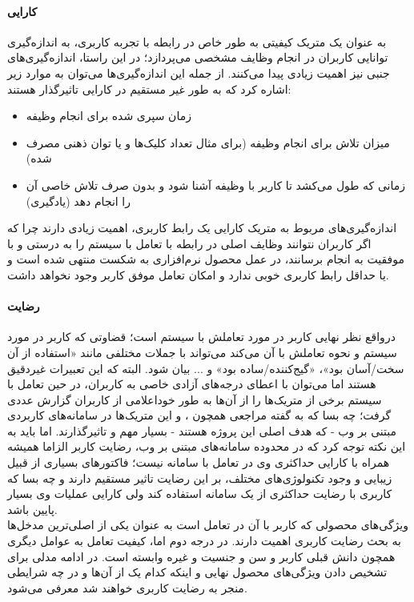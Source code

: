 \paragraph{کارایی}
به عنوان یک متریک کیفیتی به طور خاص در رابطه با تجربه کاربری، به اندازه‌گیری توانایی کاربران در انجام وظایف مشخصی می‌پردازد؛ در این راستا، اندازه‌گیری‌های جنبی نیز اهمیت زیادی پیدا می‌کنند. از جمله این اندازه‌گیری‌ها می‌توان به موارد زیر اشاره کرد که به طور غیر مستقیم در کارایی تاثیرگذار هستند:
\begin{itemize}
	\item 
	زمان سپری شده برای انجام وظیفه
	\item 
	میزان تلاش برای انجام وظیفه (برای مثال تعداد کلیک‌ها و یا توان ذهنی مصرف شده)
	\item 
	زمانی که طول می‌کشد تا کاربر با وظیفه آشنا شود و بدون صرف تلاش خاصی آن را انجام دهد (یادگیری)
\end{itemize}
اندازه‌گیری‌های مربوط به متریک کارایی یک رابط کاربری، اهمیت زیادی دارند چرا که اگر کاربران نتوانند وظایف اصلی در رابطه با تعامل با سیستم را به درستی و با موفقیت به انجام برسانند، در عمل محصول نرم‌افزاری به شکست منتهی شده است و یا حداقل رابط کاربری خوبی ندارد و امکان تعامل موفق کاربر وجود نخواهد داشت.
\paragraph{رضایت}
درواقع نظر نهایی کاربر در مورد تعاملش با سیستم است؛ قضاوتی که کاربر در مورد سیستم و نحوه تعاملش با آن می‌کند می‌تواند با جملات مختلفی مانند «استفاده از آن سخت/آسان بود»، «گیج‌کننده/ساده بود» و ... بیان شود. البته که این تعبیرات غیردقیق هستند اما می‌توان با اعطای درجه‌های آزادی خاصی به کاربران، در حین تعامل با سیستم برخی از متریک‌ها را از آن‌ها به طور خوداعلامی از کاربران گزارش عددی گرفت؛ چه بسا که به گفته مراجعی همچون
\cite{albert_measuring_2013}،
\cite{alonso-rios_usability:_2009} و
\cite{seffah_usability_2006}
این متریک‌ها در سامانه‌های کاربردی مبتنی بر وب - که هدف اصلی این پروژه هستند - بسیار مهم و تاثیرگذارند. اما باید به این نکته توجه کرد که در محدوده سامانه‌های مبتنی بر وب، رضایت کاربر الزاما همیشه همراه با کارایی حداکثری وی در تعامل با سامانه نیست؛ فاکتورهای بسیاری از قبیل زیبایی و وجود تکنولوژی‌های مختلف، بر این رضایت تاثیر مستقیم دارند و چه بسا که کاربری با رضایت حداکثری از یک سامانه استفاده کند ولی کارایی عملیات وی بسیار پایین باشد.\\
ویژگی‌های محصولی که کاربر با آن در تعامل است به عنوان یکی از اصلی‌ترین مدخل‌ها به بحث رضایت کاربری اهمیت دارند. در درجه دوم اما، کیفیت تعامل به عوامل دیگری همچون دانش قبلی کاربر و سن و جنسیت و غیره وابسته است. در ادامه مدلی برای تشخیص دادن ویژگی‌های محصول نهایی و اینکه کدام یک از آن‌ها و در چه شرایطی منجر به رضایت کاربری خواهند شد معرفی می‌شود.
